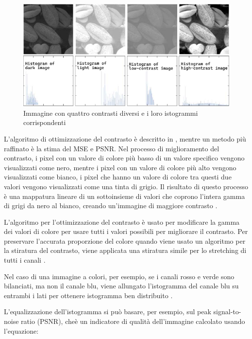 \begin{figure}[ht]
    \centering
    \includegraphics[width=1\textwidth]{preprocessing/histogram-contrast.pdf}
    \caption{Immagine con quattro contrasti diversi e i loro istogrammi corrispondenti}
    \label{fig:histogram-contrast}
\end{figure}

L'algoritmo di ottimizzazione del contrasto è descritto in \cite{gonzalez_dip}, mentre un metodo più raffinato è la stima del MSE e PSNR. Nel processo di miglioramento del contrasto, i pixel con
un valore di colore più basso di un valore specifico vengono visualizzati come
nero, mentre i pixel con un valore di colore più alto vengono
visualizzati come bianco, i pixel che hanno un valore di colore tra questi due valori vengono visualizzati come una tinta di grigio.
Il risultato di questo processo è una mappatura lineare di un
sottoinsieme di valori che coprono l'intera gamma di grigi da
nero al bianco, creando un'immagine di maggiore contrasto \cite{sunaryo_preprocessing}. 

L'algoritmo per l'ottimizzazione del contrasto è usato per modificare
la gamma dei valori di colore per usare tutti i valori possibili per
migliorare il contrasto. Per preservare l'accurata proporzione del colore
quando viene usato un algoritmo per la  stiratura del contrasto,
viene applicata una stiratura simile per lo stretching di tutti i canali \cite{sunaryo_preprocessing}. 

Nel caso di una immagine a colori, per esempio, se i canali rosso e verde sono bilanciati, ma non il canale blu, viene allungato l'istogramma del canale blu su entrambi i lati per ottenere
istogramma ben distribuito \cite{sunaryo_preprocessing}.

L'equalizzazione dell'istogramma si può basare, per esempio, sul peak signal-to-noise ratio (PSNR), cheè un indicatore di qualità dell'immagine  calcolato usando l'equazione:

